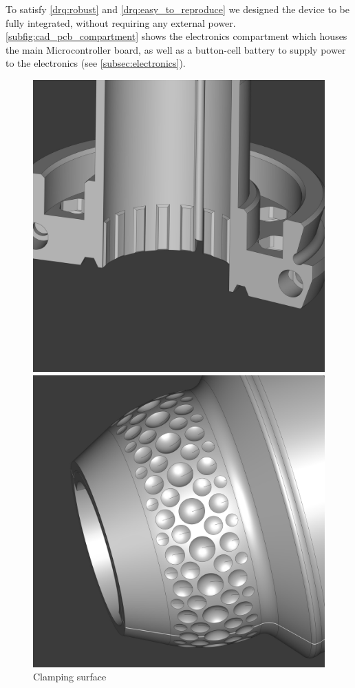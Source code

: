 To satisfy \ref{drq:robust} and \ref{drq:easy_to_reproduce} we designed the device to be fully integrated, without requiring any external power.
\autoref{subfig:cad_pcb_compartment} shows the electronics compartment which houses the main Microcontroller board, as well as a button-cell battery to supply power to the electronics (see \autoref{subsec:electronics}).

\begin{figure}[!htb]
    \centering
    \begin{minipage}{.3333\textwidth}
        \centering
        \includegraphics[width=.9\linewidth]{images/cad_clamping_surface.jpg}
        \caption{Clamping surface}
        \label{subfig:cad_clamping_surface}
    \end{minipage}%
    \begin{minipage}{.3333\textwidth}
        \centering
        \includegraphics[width=.9\linewidth]{images/cad_grip_texture.jpg}

\end{minipage}
\end{figure}
